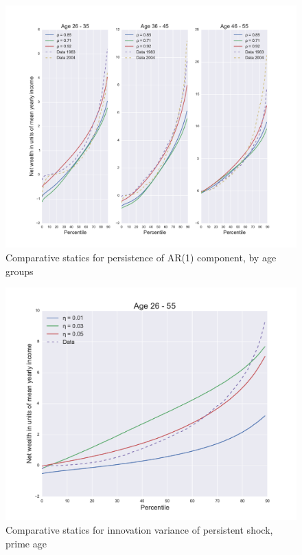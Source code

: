 \begin{figure}
\includegraphics[width=\columnwidth]{comp_stat_rho_agedetail}
\caption{Comparative statics for persistence of AR(1) component, by age groups}
\label{fig:comp_stat_rho_agedetail}
\end{figure}

\begin{figure}
\includegraphics[width=\columnwidth]{comp_stat_eta}
\caption{Comparative statics for innovation variance of persistent shock, prime age}
\label{fig:comp_stat_eta}
\end{figure}

